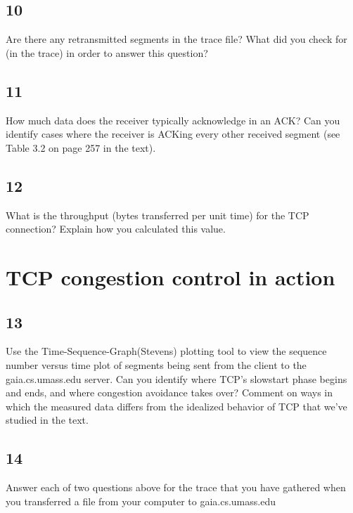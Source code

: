\documentclass[12pt]{article}
\begin{document}
\subsection{10}
Are there any retransmitted segments in the trace file? What did you check for (in
the trace) in order to answer this question?

\subsection{11}
How much data does the receiver typically acknowledge in an ACK? Can you
identify cases where the receiver is ACKing every other received segment (see
Table 3.2 on page 257 in the text).

\subsection{12}
What is the throughput (bytes transferred per unit time) for the TCP connection?
Explain how you calculated this value.

\section{TCP congestion control in action}
\subsection{13} 
Use the Time-Sequence-Graph(Stevens) plotting tool to view the sequence
number versus time plot of segments being sent from the client to the
gaia.cs.umass.edu server. Can you identify where TCP’s slowstart phase begins
and ends, and where congestion avoidance takes over? Comment on ways in
which the measured data differs from the idealized behavior of TCP that we’ve
studied in the text.

\subsection{14}
Answer each of two questions above for the trace that you have gathered when
you transferred a file from your computer to gaia.cs.umass.edu
\end{document}
